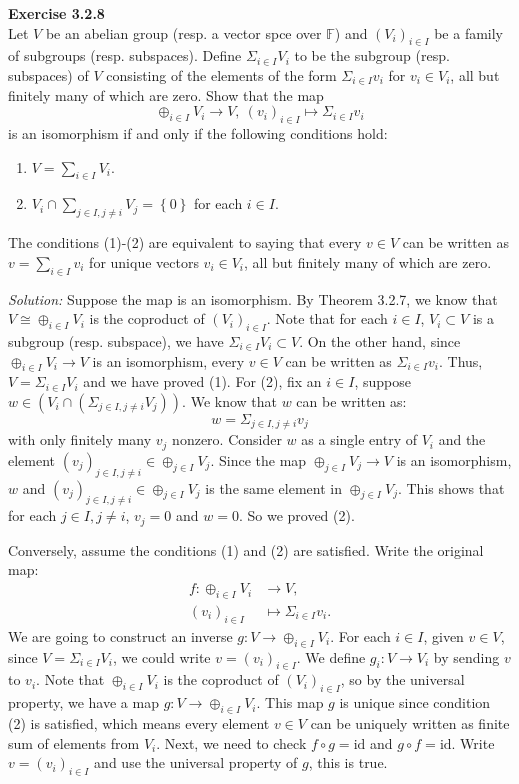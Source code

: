 \documentclass[a4paper, 11pt]{article}
\newenvironment{problem}[2][Exercise]
    { \begin{mdframed}[backgroundcolor=gray!20] \textbf{#1 #2} \\}
    {  \end{mdframed}}
\newenvironment{solution}
    {\textit{Solution:}}
    {}
\begin{document}
\begin{problem}{3.2.8}
Let \(V\) be an abelian group (resp. a vector spce over \(\mathbb{F}\)) and \((V_i)_{i\in I}\) be a family of subgroups (resp. subspaces). Define \(\Sigma_{i\in I}V_i\) 
to be the subgroup (resp. subspaces) of \(V\) consisting of the elements of the form \(\Sigma_{i\in I}v_i\) for \(v_i\in V_i\), all but finitely many of which are zero. Show that 
the map 
$$\oplus_{i\in I}V_i\rightarrow V,\ (v_i)_{i\in I}\mapsto \Sigma_{i\in I}v_i$$
is an isomorphism if and only if the following conditions hold:
\begin{enumerate}
    \item \(V=\sum_{i\in I}V_i\).
    \item \(V_i\cap \sum_{j\in I, j\neq i}V_j=\left\{ 0 \right\}\) for each \(i\in I\).
\end{enumerate}
The conditions (1)-(2) are equivalent to saying that every \(v\in V\) can be written as \(v=\sum_{i\in I}v_i\) for unique vectors \(v_i\in V_i\), all but 
finitely many of which are zero.
\end{problem}
\begin{solution}
Suppose the map is an isomorphism. By Theorem 3.2.7, we know that \(V\cong \oplus_{i\in I}V_i\) is the coproduct of \((V_i)_{i\in I}\). Note that for each \(i\in I\), 
\(V_i\subset V\) is a subgroup (resp. subspace), we have \(\Sigma_{i\in I}V_i\subset V\). On the other hand, since \(\oplus_{i\in I}V_i\rightarrow V\) is an isomorphism, every \(v\in V\) can be written as 
\(\Sigma_{i\in I}v_i\). Thus, \(V=\Sigma_{i\in I}V_i\) and we have proved (1). For (2), fix an \(i\in I\), suppose \(w\in (V_i\cap (\Sigma_{j\in I, j\neq i}V_j))\). We know that \(w\) 
can be written as:
$$w=\Sigma_{j\in I,j\neq i}v_j$$
with only finitely many \(v_j\) nonzero. Consider \(w\) as a single entry of \(V_i\) and the element \((v_j)_{j\in I, j\neq i}\in \oplus_{j\in I}V_j\). Since the map \(\oplus_{j\in I}V_j\rightarrow V\) is an isomorphism, \(w\) and \((v_j)_{j\in I, j\neq i}\in \oplus_{j\in I}V_j\) 
is the same element in \(\oplus_{j\in I}V_j\). This shows that for each \(j\in I, j\neq i\), \(v_j=0\) and \(w=0\). So we proved (2). 
\par 
Conversely, assume the conditions (1) and (2) are satisfied. Write the original map:
\begin{align*}
    f:\oplus_{i\in I}V_i & \rightarrow V,\\ 
    (v_i)_{i\in I} & \mapsto \Sigma_{i\in I}v_i.
\end{align*}
We are going to construct an inverse \(g:V\rightarrow \oplus_{i\in I}V_i\). For each \(i\in I\), given \(v\in V\), since \(V=\Sigma_{i\in I}V_i\), we could write \(v=(v_i)_{i\in I}\). We define \(g_i:V\rightarrow V_i\) by sending 
\(v\) to \(v_i\). Note that \(\oplus_{i\in I}V_i\) is the coproduct of \((V_i)_{i\in I}\), so by the universal property, we have a map \(g:V\rightarrow \oplus_{i\in I}V_i\). This map \(g\) is unique since condition (2) is satisfied, which means 
every element \(v\in V\) can be uniquely written as finite sum of elements from \(V_i\). Next, we need to check \(f\circ g=\text{id}\) and \(g\circ f=\text{id}\). Write \(v=(v_i)_{i\in I}\) and use the universal property of \(g\), this is true. 
\end{solution}
\end{document}
